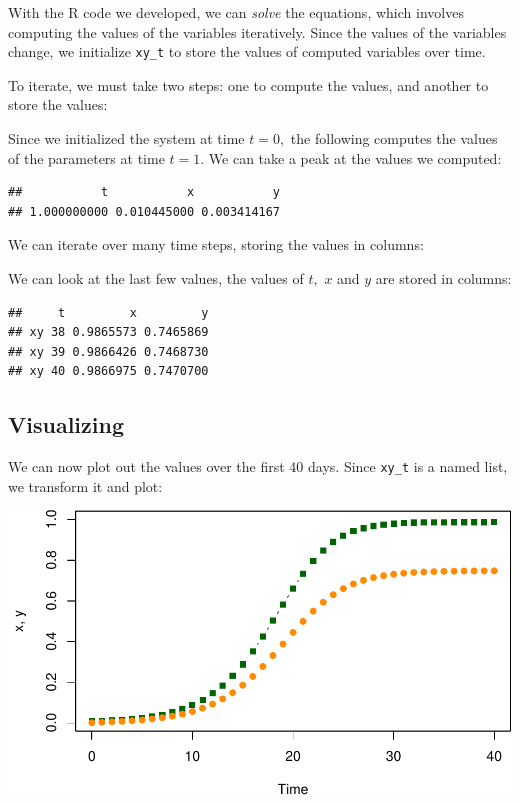 \documentclass[
]{book}
\begin{document}
With the R code we developed, we can \emph{solve} the equations, which involves computing the values of the variables iteratively. Since the values of the variables change, we initialize \texttt{xy\_t} to store the values of computed variables over time.

To iterate, we must take two steps: one to compute the values, and another to store the values:

Since we initialized the system at time \(t=0,\) the following computes the values of the parameters at time \(t=1.\) We can take a peak at the values we computed:

\begin{verbatim}
##           t           x           y 
## 1.000000000 0.010445000 0.003414167
\end{verbatim}

We can iterate over many time steps, storing the values in columns:

We can look at the last few values, the values of \(t,\) \(x\) and \(y\) are stored in columns:

\begin{verbatim}
##     t         x         y
## xy 38 0.9865573 0.7465869
## xy 39 0.9866426 0.7468730
## xy 40 0.9866975 0.7470700
\end{verbatim}

\subsection{Visualizing}\label{visualizing}

We can now plot out the values over the first 40 days. Since \texttt{xy\_t} is a named list, we transform it and plot:

\includegraphics{docs/figs/unnamed-chunk-11-1.pdf}
\end{document}
